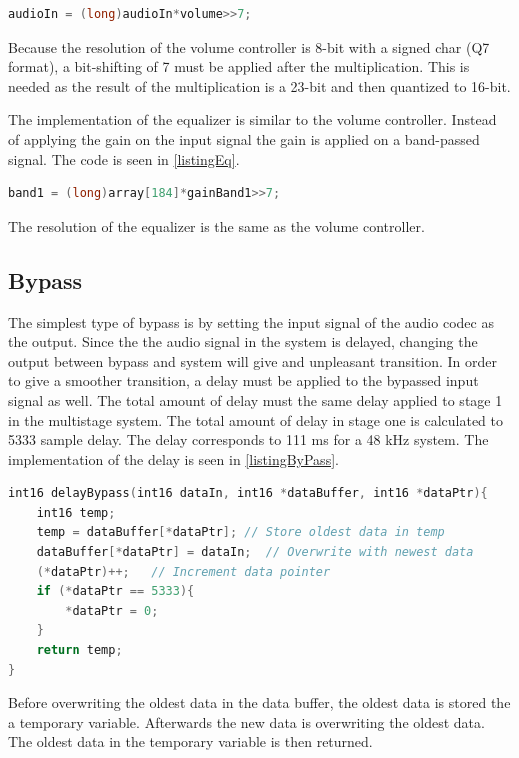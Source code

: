 \begin{lstlisting}[language=C, caption = {Gain adjustment in DSP},label={listingVolume}]
audioIn = (long)audioIn*volume>>7;
\end{lstlisting}

Because the resolution of the volume controller is 8-bit with a signed char (Q7 format), a bit-shifting of 7 must be applied after the multiplication. This is needed as the result of the multiplication is a 23-bit and then quantized to 16-bit.

The implementation of the equalizer is similar to the volume controller. Instead of applying the gain on the input signal the gain is applied on a band-passed signal. The code is seen in \autoref{listingEq}.

\begin{lstlisting}[language=C, caption = {Gain adjustment in DSP},label={listingEq}]
band1 = (long)array[184]*gainBand1>>7;
\end{lstlisting}

The resolution of the equalizer is the same as the volume controller. 

\subsection*{Bypass}
The simplest type of bypass is by setting the input signal of the audio codec as the output. Since the the audio signal in the system is delayed, changing the output between bypass and system will give and unpleasant transition. In order to give a smoother transition, a delay must be applied to the bypassed input signal as well. The total amount of delay must the same delay applied to stage 1 in the multistage system. The total amount of delay in stage one is calculated to 5333 sample delay. The delay corresponds to 111 ms for a 48 kHz system. The implementation of the delay is seen in \autoref{listingByPass}.

\begin{lstlisting}[language=C, caption = {Delay function for bypass},label={listingByPass}]
int16 delayBypass(int16 dataIn, int16 *dataBuffer, int16 *dataPtr){
	int16 temp;
	temp = dataBuffer[*dataPtr]; // Store oldest data in temp
	dataBuffer[*dataPtr] = dataIn;	// Overwrite with newest data
	(*dataPtr)++;	// Increment data pointer
	if (*dataPtr == 5333){	
		*dataPtr = 0;	
	}
	return temp;
}
\end{lstlisting}

Before overwriting the oldest data in the data buffer, the oldest data is stored the a temporary variable. Afterwards the new data is overwriting the oldest data. The oldest data in the temporary variable is then returned.

